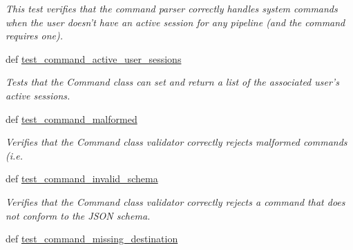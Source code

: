 \begin{DoxyCompactItemize}
\begin{DoxyCompactList}\small\item\em This test verifies that the command parser correctly handles system commands when the user doesn't have an active session for any pipeline (and the command requires one). \end{DoxyCompactList}\item 
\hypertarget{classhwm_1_1command_1_1tests_1_1test__command__infrastructure_1_1_test_command_infrastructure_a2367962b98022ad0fe5ccdaabe7ed5c0}{def \hyperlink{classhwm_1_1command_1_1tests_1_1test__command__infrastructure_1_1_test_command_infrastructure_a2367962b98022ad0fe5ccdaabe7ed5c0}{test\-\_\-command\-\_\-active\-\_\-user\-\_\-sessions}}\label{classhwm_1_1command_1_1tests_1_1test__command__infrastructure_1_1_test_command_infrastructure_a2367962b98022ad0fe5ccdaabe7ed5c0}

\begin{DoxyCompactList}\small\item\em Tests that the Command class can set and return a list of the associated user's active sessions. \end{DoxyCompactList}\item 
def \hyperlink{classhwm_1_1command_1_1tests_1_1test__command__infrastructure_1_1_test_command_infrastructure_a161667bd3fb0a1e5d7662f2c5d11b28a}{test\-\_\-command\-\_\-malformed}
\begin{DoxyCompactList}\small\item\em Verifies that the Command class validator correctly rejects malformed commands (i.\-e. \end{DoxyCompactList}\item 
\hypertarget{classhwm_1_1command_1_1tests_1_1test__command__infrastructure_1_1_test_command_infrastructure_ad7426d9ceccb27dbd1f42d1194a42b2f}{def \hyperlink{classhwm_1_1command_1_1tests_1_1test__command__infrastructure_1_1_test_command_infrastructure_ad7426d9ceccb27dbd1f42d1194a42b2f}{test\-\_\-command\-\_\-invalid\-\_\-schema}}\label{classhwm_1_1command_1_1tests_1_1test__command__infrastructure_1_1_test_command_infrastructure_ad7426d9ceccb27dbd1f42d1194a42b2f}

\begin{DoxyCompactList}\small\item\em Verifies that the Command class validator correctly rejects a command that does not conform to the J\-S\-O\-N schema. \end{DoxyCompactList}\item 
\hypertarget{classhwm_1_1command_1_1tests_1_1test__command__infrastructure_1_1_test_command_infrastructure_ade048afde6deaa2d2e5a5cfad838e7d5}{def \hyperlink{classhwm_1_1command_1_1tests_1_1test__command__infrastructure_1_1_test_command_infrastructure_ade048afde6deaa2d2e5a5cfad838e7d5}{test\-\_\-command\-\_\-missing\-\_\-destination}}\label{classhwm_1_1command_1_1tests_1_1test__command__infrastructure_1_1_test_command_infrastructure_ade048afde6deaa2d2e5a5cfad838e7d5}


\end{DoxyCompactItemize}
